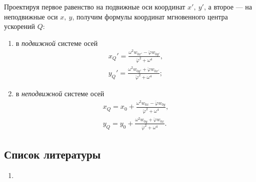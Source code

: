 Проектируя первое равенство на подвижные оси координат $x',~y'$, а второе --- на
неподвижные оси $x,~y$, получим формулы координат мгновенного центра ускорений
$Q$:
\begin{enumerate}
  \item в \textit{подвижной} системе осей
    \begin{equation}
      \label{eq:instantaneous_acceleration_center_movable_coords}
      \begin{gathered}
        x_Q' = \frac
          {\omega^2 w_{0x'} - \ddot{\varphi} w_{0y'}}
          {\ddot{\varphi}^2 + \omega^4}, \\
        y_Q' = \frac
          {\omega^2 w_{0y'} + \ddot{\varphi} w_{0x'}}
          {\ddot{\varphi}^2 + \omega^4};
      \end{gathered}
    \end{equation}

  \item в \textit{неподвижной} системе осей
    \begin{equation}
      \label{eq:instantaneous_acceleration_center_immovable_coords}
      \begin{gathered}
        x_Q = x_0 + \frac
          {\omega^2 w_{0x} - \ddot{\varphi} w_{0y}}
          {\ddot{\varphi}^2 + \omega^4}, \\
        y_Q = y_0 + \frac
          {\omega^2 w_{0y} + \ddot{\varphi} w_{0x}}
          {\ddot{\varphi}^2 + \omega^4}.
      \end{gathered}
    \end{equation}
\end{enumerate}

\subsection{Список литературы}
\begin{enumerate}
  \item \cite{lourie}
\end{enumerate}

